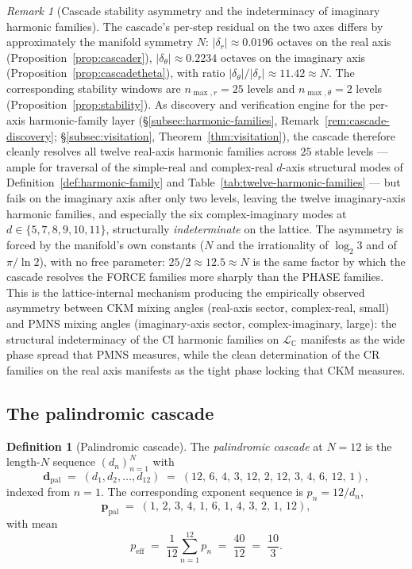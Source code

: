 \documentclass[11pt,a4paper]{article}
\theoremstyle{definition}
\newtheorem{definition}[theorem]{Definition}
\theoremstyle{remark}
\newtheorem{remark}[theorem]{Remark}
\newcommand{\C}{\mathbb{C}}
\begin{document}
\begin{remark}[Cascade stability asymmetry and the indeterminacy of imaginary harmonic families]\label{rem:cascade-asymmetry-CI}
The cascade's per-step residual on the two axes differs by approximately the manifold symmetry $N$: $|\delta_{r}| \approx 0.0196$ octaves on the real axis (Proposition~\ref{prop:cascader}), $|\delta_{\theta}| \approx 0.2234$ octaves on the imaginary axis (Proposition~\ref{prop:cascadetheta}), with ratio $|\delta_{\theta}|/|\delta_{r}| \approx 11.42 \approx N$. The corresponding stability windows are $n_{\max,r} = 25$ levels and $n_{\max,\theta} = 2$ levels (Proposition~\ref{prop:stability}). As discovery and verification engine for the per-axis harmonic-family layer (\S\ref{subsec:harmonic-families}, Remark~\ref{rem:cascade-discovery}; \S\ref{subsec:visitation}, Theorem~\ref{thm:visitation}), the cascade therefore cleanly resolves all twelve real-axis harmonic families across $25$ stable levels --- ample for traversal of the simple-real and complex-real $d$-axis structural modes of Definition~\ref{def:harmonic-family} and Table~\ref{tab:twelve-harmonic-families} --- but fails on the imaginary axis after only two levels, leaving the twelve imaginary-axis harmonic families, and especially the six complex-imaginary modes at $d \in \{5,7,8,9,10,11\}$, structurally \emph{indeterminate} on the lattice. The asymmetry is forced by the manifold's own constants ($N$ and the irrationality of $\log_{2}3$ and of $\pi/\ln 2$), with no free parameter: $25/2 \approx 12.5 \approx N$ is the same factor by which the cascade resolves the FORCE families more sharply than the PHASE families. This is the lattice-internal mechanism producing the empirically observed asymmetry between CKM mixing angles (real-axis sector, complex-real, small) and PMNS mixing angles (imaginary-axis sector, complex-imaginary, large): the structural indeterminacy of the CI harmonic families on $\mathcal{L}_{\C}$ manifests as the wide phase spread that PMNS measures, while the clean determination of the CR families on the real axis manifests as the tight phase locking that CKM measures.
\end{remark}

\subsection{The palindromic cascade}

\begin{definition}[Palindromic cascade]\label{def:palindrome}
The \emph{palindromic cascade} at $N=12$ is the length-$N$ sequence $(d_{n})_{n=1}^{N}$ with
\[
\mathbf{d}_{\mathrm{pal}} \;=\; (d_{1},d_{2},\ldots,d_{12}) \;=\; (12,\,6,\,4,\,3,\,12,\,2,\,12,\,3,\,4,\,6,\,12,\,1),
\]
indexed from $n=1$. The corresponding exponent sequence is $p_{n}=12/d_{n}$,
\[
\mathbf{p}_{\mathrm{pal}} \;=\; (1,\,2,\,3,\,4,\,1,\,6,\,1,\,4,\,3,\,2,\,1,\,12),
\]
with mean
\[
p_{\mathrm{eff}} \;=\; \frac{1}{12}\sum_{n=1}^{12}p_{n} \;=\; \frac{40}{12} \;=\; \frac{10}{3}.
\]
\end{definition}
\end{document}
